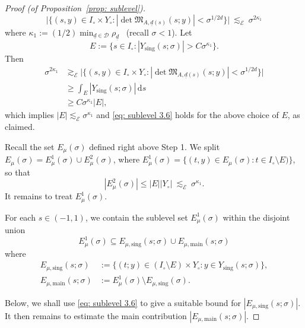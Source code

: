\documentclass[reqno]{amsart}
\numberwithin{equation}{section}
\newcommand{\cD}{\mathcal{D}}
\newcommand{\ud}{\mathrm{d}}
\newcommand{\sE}{\mathscr{E}}
\newcommand{\fM}{\mathfrak{M}}
\theoremstyle{plain}
\theoremstyle{definition}
\begin{document}
\begin{proof}[Proof (of Proposition~\ref{prop: sublevel})]
\begin{equation*}
   \bigl|\bigl\{ (s,y) \in I_{\circ} \times Y_{\circ} : |\det \fM_{A, {\underline{d}}(s)}(s; y)| < \sigma^{1/2d} \bigr\}\bigr|  \ \lesssim_{\sE} \ \sigma^{2 \kappa_1} 
\end{equation*}
where $\kappa_1 := (1/2)\min_{{\underline{d}}\in \cD} \rho_{{\underline{d}}}$ \, (recall $\sigma<1$).
Let 
\begin{equation*}
 E := \{s \in I_{\circ}: |Y_{\mathrm{sing}}(s; \sigma)| > C \sigma^{\kappa_1}\}.    
\end{equation*}
Then
\begin{align*}
    \sigma^{2\kappa_1}  &\gtrsim_{\sE}  \bigl|\big\{ (s,y) \in I_{\circ} \times Y_{\circ} : |\det \fM_{A, {\underline{d}}(s)}(s; y)| < \sigma^{1/2d} \big\}\bigr|  \\
&\geq  \int_E |Y_{\mathrm{sing}}(s; \sigma)| \, \ud s  \\
&\geq C \sigma^{\kappa_1} |E|,
\end{align*}
which implies $|E| \lesssim_{\sE} \sigma^{\kappa_1}$ 
and \eqref{eq: sublevel 3.6} holds for the above choice of $E$, as claimed. 

Recall the set $E_\mu(\sigma)$ defined right above Step 1. We split $E_{\mu}(\sigma) = E^1_{\mu}(\sigma) \cup E^2_{\mu}(\sigma)$, where $E^1_{\mu}(\sigma) = \{(t,y) \in E_{\mu}(\sigma) : t \in I_{\circ}\setminus E) \}$, so that
$$
|E^2_{\mu}(\sigma)|  \le  |E| |Y_{\circ}| \ \lesssim_{\sE} \ \sigma^{\kappa_1}.
$$
It remains to treat $E^1_{\mu}(\sigma)$.

For each $s \in (-1,1)$, we contain the sublevel set $E^1_{\mu}(\sigma)$ within the disjoint union 
\begin{equation}\label{eq: sublevel 3.54}
  E^1_{\mu}(\sigma) \subseteq E_{\mu, \mathrm{sing}}(s; \sigma)  
 \cup E_{\mu, \mathrm{main}}(s; \sigma) 
\end{equation}
where
\begin{align}\label{eq: sublevel 3.55}
 E_{\mu, \mathrm{sing}}(s;\sigma) &:= \{(t;y) \in (I_{\circ} \setminus E) \times Y_{\circ} : y \in Y_{\mathrm{sing}}(s;\sigma) \}, \\
 \nonumber
 E_{\mu, \mathrm{main}}(s;\sigma) &:= E^1_{\mu}(\sigma) \setminus E_{\mu, \mathrm{sing}}(\sigma). 
\end{align}

Below, we shall use \eqref{eq: sublevel 3.6} to give a suitable bound for $|E_{\mu, \mathrm{sing}}(s;\sigma)|$. It then remains to estimate the main contribution $|E_{\mu, \mathrm{main}}(s;\sigma)|$.\medskip


\end{proof}
\end{document}

